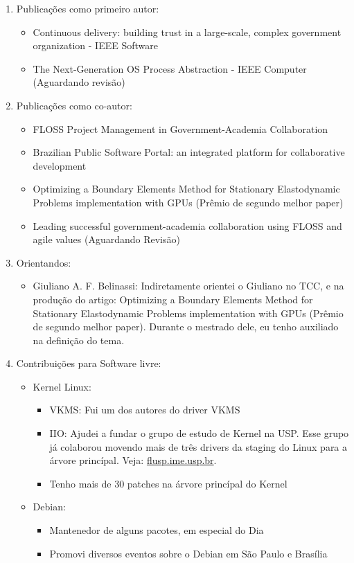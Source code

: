 \begin{enumerate}
  \item Publicações como primeiro autor:
    \begin{itemize}
      \item Continuous delivery: building trust in a large-scale, complex government organization - IEEE Software
      \item The Next-Generation OS Process Abstraction - IEEE Computer (Aguardando revisão)
    \end{itemize}

  \item Publicações como co-autor:
    \begin{itemize}
      \item FLOSS Project Management in Government-Academia Collaboration
      \item Brazilian Public Software Portal: an integrated platform for collaborative development
      \item Optimizing a Boundary Elements Method for Stationary Elastodynamic Problems implementation with GPUs (Prêmio de segundo melhor paper)
      \item Leading successful government-academia collaboration using FLOSS and agile values (Aguardando Revisão)
    \end{itemize}
  \item Orientandos:
    \begin{itemize}
      \item
Giuliano A. F. Belinassi: Indiretamente orientei o Giuliano no TCC, e na
produção do artigo: Optimizing a Boundary Elements Method for Stationary
Elastodynamic Problems implementation with GPUs (Prêmio de segundo melhor
paper). Durante o mestrado dele, eu tenho auxiliado na definição do tema.

    \end{itemize}
  \item Contribuições para Software livre:
    \begin{itemize}
      \item Kernel Linux:
        \begin{itemize}
          \item VKMS: Fui um dos autores do driver VKMS
          \item IIO: Ajudei a fundar o grupo de estudo de Kernel na USP. Esse grupo já colaborou movendo mais de três drivers da staging do Linux para a árvore princípal. Veja: \url{flusp.ime.usp.br}.
          \item Tenho mais de 30 patches na árvore princípal do Kernel
        \end{itemize}
      \item Debian:
        \begin{itemize}
          \item Mantenedor de alguns pacotes, em especial do Dia
          \item Promovi diversos eventos sobre o Debian em São Paulo e Brasília
        \end{itemize}
    \end{itemize}


\end{enumerate}
